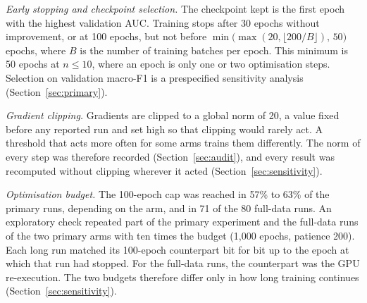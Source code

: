 \documentclass{ieeeaccess}
\begin{document}
\emph{Early stopping and checkpoint selection.} The checkpoint kept is the first epoch with the highest validation AUC. Training stops after 30 epochs without improvement, or at 100 epochs, but not before $\min\!\big(\max(20,\lfloor 200/B\rfloor),\,50\big)$ epochs, where $B$ is the number of training batches per epoch. This minimum is 50 epochs at $n\le10$, where an epoch is only one or two optimisation steps. Selection on validation macro-F1 is a prespecified sensitivity analysis (Section~\ref{sec:primary}).

\emph{Gradient clipping.} Gradients are clipped to a global norm of 20, a value fixed before any reported run and set high so that clipping would rarely act. A threshold that acts more often for some arms trains them differently. The norm of every step was therefore recorded (Section~\ref{sec:audit}), and every result was recomputed without clipping wherever it acted (Section~\ref{sec:sensitivity}).

\emph{Optimisation budget.} The 100-epoch cap was reached in 57\% to 63\% of the primary runs, depending on the arm, and in 71 of the 80 full-data runs. An exploratory check repeated part of the primary experiment and the full-data runs of the two primary arms with ten times the budget (1,000 epochs, patience 200). Each long run matched its 100-epoch counterpart bit for bit up to the epoch at which that run had stopped. For the full-data runs, the counterpart was the GPU re-execution. The two budgets therefore differ only in how long training continues (Section~\ref{sec:sensitivity}).
\end{document}
